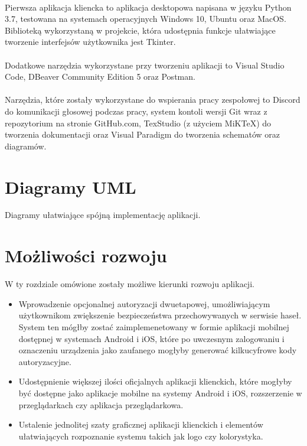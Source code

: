 \documentclass{article}
\begin{document}
	\paragraph*{} Pierwsza aplikacja kliencka to aplikacja desktopowa napisana w języku Python 3.7, testowana na systemach operacyjnych Windows 10, Ubuntu oraz MacOS. Biblioteką wykorzystaną w projekcie, która udostępnia funkcje ułatwiające tworzenie interfejsów użytkownika jest Tkinter.
	\paragraph*{} Dodatkowe narzędzia wykorzystane przy tworzeniu aplikacji to Visual Studio Code, DBeaver Community Edition 5 oraz Postman.
	\paragraph*{} Narzędzia, które zostały wykorzystane do wspierania pracy zespołowej to Discord do komunikacji głosowej podczas pracy, system kontoli wersji Git wraz z repozytorium na stronie GitHub.com, TexStudio (z użyciem MiKTeX) do tworzenia dokumentacji oraz Visual Paradigm do tworzenia schematów oraz diagramów.

    \section{Diagramy UML}
    Diagramy ułatwiające spójną implementację aplikacji.

    \section{Możliwości rozwoju}
    W ty rozdziale omówione zostały możliwe kierunki rozwoju aplikacji.

    \begin{itemize}
		\item Wprowadzenie opcjonalnej autoryzacji dwuetapowej, umożliwiającym użytkownikom zwiększenie bezpieczeństwa przechowywanych w serwisie haseł. System ten mógłby zostać zaimplemenetowany w formie aplikacji mobilnej dostępnej w systemach Android i iOS, które po uwczesnym zalogowaniu i oznaczeniu urządzenia jako zaufanego mogłyby generować kilkucyfrowe kody autoryzacyjne.
		\item Udostępnienie większej ilości oficjalnych aplikacji klienckich, które mogłyby być dostępne jako aplikacje mobilne na systemy Android i iOS, rozszerzenie w przeglądarkach czy aplikacja przeglądarkowa.
		\item Ustalenie jednolitej szaty graficznej aplikacji klienckich i elementów ułatwiających rozpoznanie systemu takich jak logo czy kolorystyka.
	\end{itemize}
\end{document}
